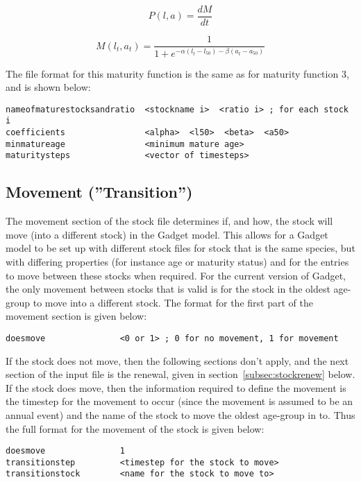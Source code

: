\documentclass [a4paper, 10pt]{book}
\begin{document}
\begin{equation}\label{eq:mat4a}
P(l, a) = \frac{dM}{dt}
\end{equation}

\begin{equation}\label{eq:mat4b}
M(l_{t},a_{t}) = \frac{1}{ 1 + e^{-\alpha(l_{t} - l_{50}) - \beta(a_{t} - a_{50})}}
\end{equation}

\bigskip
The file format for this maturity function is the same as for maturity function 3, and is shown below:

\begin{verbatim}
nameofmaturestocksandratio  <stockname i>  <ratio i> ; for each stock i
coefficients                <alpha>  <l50>  <beta>  <a50>
minmatureage                <minimum mature age>
maturitysteps               <vector of timesteps>
\end{verbatim}

\subsection{Movement (''Transition'')}\label{subsec:stockmove}
The movement section of the stock file determines if, and how, the stock will move (into a different stock) in the Gadget model.  This allows for a Gadget model to be set up with different stock files for stock that is the same species, but with differing properties (for instance age or maturity status) and for the entries to move between these stocks when required.  For the current version of Gadget, the only movement between stocks that is valid is for the stock in the oldest age-group to move into a different stock.  The format for the first part of the movement section is given below:

\begin{verbatim}
doesmove               <0 or 1> ; 0 for no movement, 1 for movement
\end{verbatim}

If the stock does not move, then the following sections don't apply, and the next section of the input file is the renewal, given in section~\ref{subsec:stockrenew} below.  If the stock does move, then the information required to define the movement is the timestep for the movement to occur (since the movement is assumed to be an annual event) and the name of the stock to move the oldest age-group in to.  Thus the full format for the movement of the stock is given below:

\begin{verbatim}
doesmove               1
transitionstep         <timestep for the stock to move>
transitionstock        <name for the stock to move to>
\end{verbatim}
\end{document}
